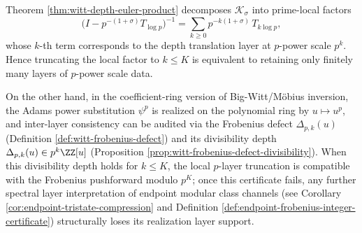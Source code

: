\begin{remark}\label{rem:witt-depth-local-p-frobenius}
Theorem \ref{thm:witt-depth-euler-product} decomposes \(\mathcal{K}_{\sigma}\) into prime-local factors
\[
\bigl(I-p^{-(1+\sigma)}T_{\log p}\bigr)^{-1}
=\sum_{k\ge 0}p^{-k(1+\sigma)}\,T_{k\log p},
\]
whose \(k\)-th term corresponds to the depth translation layer at \(p\)-power scale \(p^{k}\).
Hence truncating the local factor to \(k\le K\) is equivalent to retaining only finitely many layers of \(p\)-power scale data.
\par
On the other hand, in the coefficient-ring version of Big-Witt/M\"obius inversion, the Adams power substitution \(\psi^{p}\) is realized on the polynomial ring by \(u\mapsto u^{p}\), and inter-layer consistency can be audited via the Frobenius defect
\(
\Delta_{p,k}(u)
\)
(Definition \ref{def:witt-frobenius-defect}) and its divisibility depth
\(
\Delta_{p,k}(u)\in p^{k}\ZZ[u]
\)
(Proposition \ref{prop:witt-frobenius-defect-divisibility}).
When this divisibility depth holds for \(k\le K\), the local \(p\)-layer truncation is compatible with the Frobenius pushforward modulo \(p^{K}\); once this certificate fails, any further spectral layer interpretation of endpoint modular class channels (see Corollary \ref{cor:endpoint-tristate-compression} and Definition \ref{def:endpoint-frobenius-integer-certificate}) structurally loses its realization layer support.
\end{remark}




